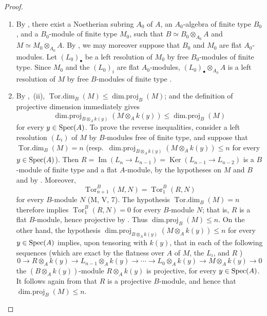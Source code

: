 \begin{proof}
\begin{enumerate}[label=(\roman*)]
  \item By , there exist a Noetherian subring $A_0$ of $A$, an $A_0$-algebra of finite type $B_0$, and a $B_0$-module of finite type $M_0$, such that $B\simeq B_0\otimes_{A_0}A$ and $M\simeq M_0\otimes_{A_0}A$.
  By , we may moreover suppose that $B_0$ and $M_0$ are flat $A_0$-modules.
  Let $(L_0)_\bullet$ be a left resolution of $M_0$ by free $B_0$-modules of finite type.
  Since $M_0$ and the $(L_0)_i$ are flat $A_0$-modules, $(L_0)_\bullet\otimes_{A_0}A$ is a left resolution of $M$ by free $B$-modules of finite type .

  \item By ,~(ii),
  $\operatorname{Tor.dim}_B(M)\leqslant\operatorname{dim.proj}_B(M)$; and the definition of projective dimension immediately gives
  \[
    \operatorname{dim.proj}_{B\otimes_A k(y)}(M\otimes_A k(y))
    \leqslant \operatorname{dim.proj}_B(M)
  \]
  for every $y\in\operatorname{Spec}(A)$.
  To prove the reverse inequalities, consider a left resolution $(L_i)$ of $M$ by $B$-modules free of finite type, and suppose that $\operatorname{Tor.dim}_B(M)=n$ (resp.\ $\operatorname{dim.proj}_{B\otimes_A k(y)}(M\otimes_A k(y))\leqslant n$ for every $y\in\operatorname{Spec}(A)$).
  Then
  $R=\operatorname{Im}(L_n\to L_{n-1})=\operatorname{Ker}(L_{n-1}\to L_{n-2})$
  is a $B$-module of finite type and a flat $A$-module, by the hypotheses on $M$ and $B$ and by .
  Moreover,
  \[
    \operatorname{Tor}_{n+1}^B(M,N)=\operatorname{Tor}_1^B(R,N)
  \]
  for every $B$-module $N$ (M, V, 7).
  The hypothesis $\operatorname{Tor.dim}_B(M)=n$ therefore implies $\operatorname{Tor}_1^B(R,N)=0$ for every $B$-module $N$; that is, $R$ is a flat $B$-module, hence projective by .
  Thus $\operatorname{dim.proj}_B(M)\leqslant n$.
  On the other hand, the hypothesis $\operatorname{dim.proj}_{B\otimes_A k(y)}(M\otimes_A k(y))\leqslant n$ for every $y\in\operatorname{Spec}(A)$ implies, upon tensoring with $k(y)$, that in each of the following sequences (which are exact by the flatness over $A$ of $M$, the $L_i$, and $R$ )
  \[
    0\to R\otimes_A k(y)\to L_{n-1}\otimes_A k(y)\to\cdots\to L_0\otimes_A k(y)\to M\otimes_A k(y)\to 0
  \]
  the $(B\otimes_A k(y))$-module $R\otimes_A k(y)$ is projective, for every $y\in\operatorname{Spec}(A)$.
  It follows again from  that $R$ is a projective $B$-module, and hence that $\operatorname{dim.proj}_B(M)\leqslant n$.
\end{enumerate}
\end{proof}

